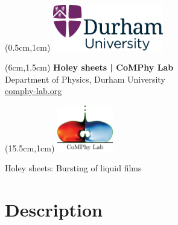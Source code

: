 \documentclass[11pt]{article}
\newlength{\headertobodysep}
\begin{document}
\thispagestyle{empty}

\textblockorigin{0pt}{0pt}

\begin{textblock*}{5cm}(0.5cm,1cm)
    \includegraphics[height=2cm]{../_logosAndRef/Durham-University.pdf}
\end{textblock*}

\begin{textblock*}{9cm}(6cm,1.5cm)
    \centering
    {\large \textbf{Holey sheets | CoMPhy Lab}}\\[0.2em]
    Department of Physics, Durham University\\[0.3em]
    \href{https://comphy-lab.org}{comphy-lab.org}
\end{textblock*}

\begin{textblock*}{5cm}(15.5cm,1cm) %
    \includegraphics[height=2cm]{../_logosAndRef/CoMPhy-Lab.png}
\end{textblock*}

\vspace*{\headertobodysep}

\begin{center}
    \begin{LARGE}
     Holey sheets: Bursting of liquid films
    \end{LARGE}
\end{center}

\section*{Description}
\end{document}
